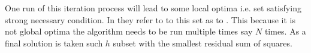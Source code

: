 





One run of this iteration process will lead to some local optima i.e. set satisfying strong necessary condition. In \cite{hawkins:1994} they refer to to this set as to .
This because it is not global optima the algorithm needs to be run multiple times say $N$ times. As a final solution is taken such $h$  subset with the smallest residual sum of squares. 

